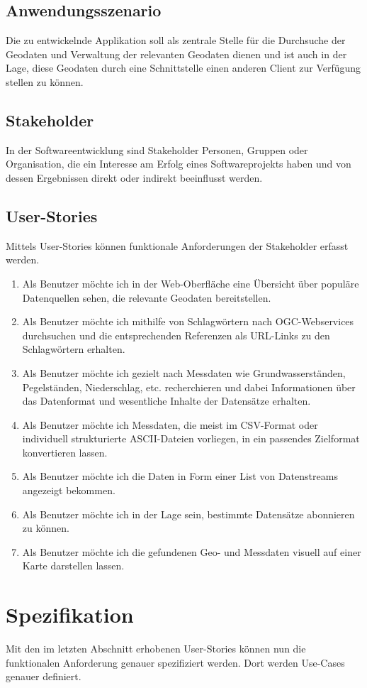 \documentclass[a4paper,12pt]{scrreprt}
\begin{document}
\subsection{Anwendungsszenario}
Die zu entwickelnde Applikation soll als zentrale Stelle für die Durchsuche der Geodaten und Verwaltung der relevanten Geodaten dienen und ist auch in der Lage, diese Geodaten durch eine Schnittstelle einen anderen Client zur Verfügung stellen zu können.
\subsection{Stakeholder}
In der Softwareentwicklung sind Stakeholder Personen, Gruppen oder Organisation, die ein Interesse am Erfolg eines Softwareprojekts haben und von dessen Ergebnissen direkt oder indirekt beeinflusst werden.

\subsection{User-Stories}
Mittels User-Stories können funktionale Anforderungen der Stakeholder erfasst werden.
\begin{enumerate}
\item Als Benutzer möchte ich in der Web-Oberfläche eine Übersicht über populäre Datenquellen sehen, die  relevante Geodaten bereitstellen.
\item Als Benutzer möchte ich mithilfe von Schlagwörtern nach OGC-Webservices durchsuchen und die entsprechenden Referenzen als URL-Links zu den Schlagwörtern erhalten.
\item Als Benutzer möchte ich gezielt nach Messdaten wie Grundwasserständen, Pegelständen, Niederschlag, etc. recherchieren und dabei Informationen über das Datenformat und wesentliche Inhalte der Datensätze erhalten.
\item Als Benutzer möchte ich Messdaten, die meist im CSV-Format oder individuell strukturierte ASCII-Dateien vorliegen, in ein passendes Zielformat konvertieren lassen.
\item Als Benutzer möchte ich die Daten in Form einer List von Datenstreams angezeigt bekommen.
\item Als Benutzer möchte ich in der Lage sein, bestimmte Datensätze abonnieren zu können.
\item Als Benutzer möchte ich die gefundenen Geo- und Messdaten visuell auf einer Karte darstellen lassen.
\end{enumerate}

\section{Spezifikation}
Mit den im letzten Abschnitt erhobenen User-Stories können nun die funktionalen Anforderung genauer spezifiziert werden. Dort werden Use-Cases genauer definiert.
\end{document}
